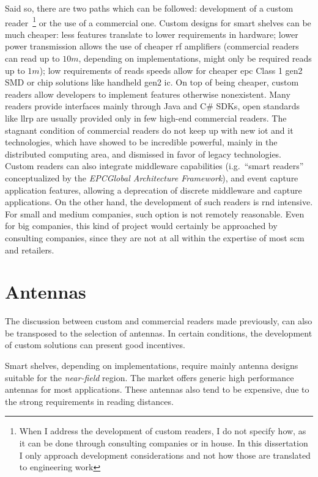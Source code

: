 Said so, there are two paths which can be followed: development of a custom reader~\footnote{When I address the development of custom readers, I do not specify how, as it can be done through consulting companies or in house. In this dissertation I only approach development considerations and not how those are translated to engineering work} or the use of a commercial one. 
Custom designs for smart shelves can be much cheaper: less features translate to lower requirements in hardware; lower power transmission allows the use of cheaper \ac{rf} amplifiers (commercial readers can read up to $10m$, depending on implementations, might only be required reads up to $1m$); low requirements of reads speeds allow for cheaper \ac{epc} Class 1 \ac{gen2} SMD or chip solutions like handheld \ac{gen2} \acs{ic}.
On top of being cheaper, custom readers allow developers to implement features otherwise nonexistent. Many readers provide interfaces mainly through Java and C\# SDKs, open standards like \ac{llrp} are usually provided only in few high-end commercial readers. The stagnant condition of commercial readers do not keep up with new \ac{iot} and \ac{it} technologies, which have showed to be incredible powerful, mainly in the distributed computing area, and dismissed in favor of legacy technologies.
Custom readers can also integrate middleware capabilities (i.g.\ ``smart readers'' conceptualized by the \emph{EPCGlobal Architecture Framework}), and event capture application features, allowing a deprecation of discrete middleware and capture applications.
On the other hand, the development of such readers is \ac{rnd} intensive. For small and medium companies, such option is not remotely reasonable. Even for big companies, this kind of project would certainly be approached by consulting companies, since they are not at all within the expertise of most \ac{scm} and retailers.

\section{Antennas}

The discussion between custom and commercial readers made previously, can also be transposed to the selection of antennas. In certain conditions, the development of custom solutions can present good incentives.

Smart shelves, depending on implementations, require mainly antenna designs suitable for the \emph{near-field} region.
The market offers generic high performance antennas for most applications. These antennas also tend to be expensive, due to the strong requirements in reading distances. 

